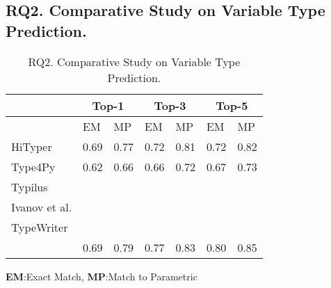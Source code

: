 \subsection{{\bf RQ2. Comparative Study on Variable Type Prediction.}}
\label{empirical-rq2}

\begin{table}[t]
	\caption{RQ2. Comparative Study on Variable Type Prediction.}
	\begin{center}
		\small
		\renewcommand{\arraystretch}{1} \begin{tabular}{p{1.7cm}<{\centering}|p{0.65cm}<{\centering}|p{0.65cm}<{\centering}|p{0.65cm}<{\centering}|p{0.65cm}<{\centering}|p{0.65cm}<{\centering}|p{0.65cm}<{\centering}}
			
			\hline
                       & \multicolumn{2}{c}{Top-1}         & \multicolumn{2}{c}{Top-3}         & \multicolumn{2}{c}{Top-5} \\
			\hline
                       & EM & MP & EM & MP & EM & MP  \\ 
			\hline
			HiTyper                                & 0.69 & 0.77 & 0.72 & 0.81 & 0.72 & 0.82 \\
			Type4Py                                & 0.62 & 0.66 & 0.66 & 0.72 & 0.67 & 0.73 \\
			Typilus                                &      &      &      &      &      &      \\
			Ivanov et al.\cite{ivanov21predicting} &      &      &      &      &      &      \\
			TypeWriter                             &      &      &      &      &      &      \\
			\hline
			{\tool}                                & 0.69 & 0.79 & 0.77 & 0.83 & 0.80 & 0.85 \\
			\hline
		\end{tabular}
		\label{RQ2-result}
		{\bf EM}:Exact Match, {\bf MP}:Match to Parametric
	\end{center}
\end{table}

{\color{red}{I found that the hityper and type4py have results on the dataset ManyTypes4PY. Our results are a little bit different from theirs. I think the reason is that we only use 25k+ while they use the full dataset. To make it consistent, I changed the numbers here in the table to the results that they got on the full dataset. But I still keep our results on google slides in case we need them.}}

